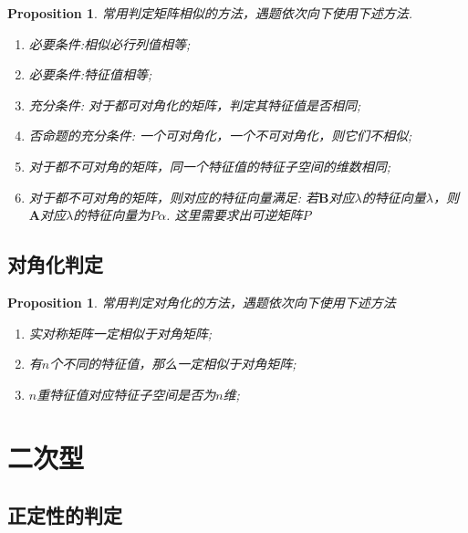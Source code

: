 \documentclass{article}
\newtheorem{proposition}[theorem]{Proposition}
\newcommand{\mbf}[1]{\bm{#1}}
\begin{document}
\begin{proposition}
\rm 常用判定矩阵相似的方法，遇题依次向下使用下述方法.
\begin{enumerate}
	\item 必要条件:相似必行列值相等;
	\item 必要条件:特征值相等;
	\item 充分条件: 对于都可对角化的矩阵，判定其特征值是否相同;
	\item 否命题的充分条件: 一个可对角化，一个不可对角化，则它们不相似;
	\item 对于都不可对角的矩阵，同一个特征值的特征子空间的维数相同;	
	\item 对于都不可对角的矩阵，则对应的特征向量满足: 若$\mbf{B}$对应$\lambda$的特征向量$\lambda$，则$\mbf{A}$对应$\lambda$的特征向量为$P\alpha$. 这里需要求出可逆矩阵$P$
\end{enumerate}
\end{proposition}

\subsection{对角化判定}

\begin{proposition}
\rm 常用判定对角化的方法，遇题依次向下使用下述方法
\begin{enumerate}
	\item 实对称矩阵一定相似于对角矩阵;	
	\item 有$n$个不同的特征值，那么一定相似于对角矩阵;
	\item $n$重特征值对应特征子空间是否为$n$维;
\end{enumerate}
\end{proposition}

\section{二次型}

\subsection{正定性的判定}
\end{document}
